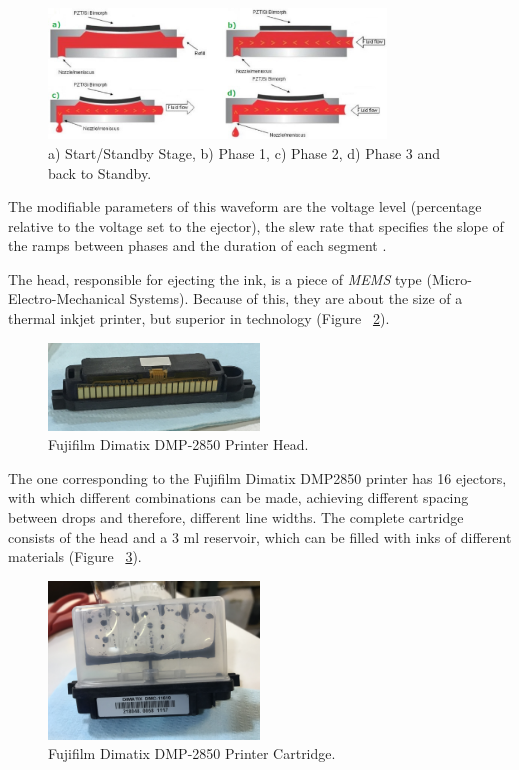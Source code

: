 \begin{figure}[H]
  \centering
    \includegraphics[width=0.8\textwidth]{Figures/Figura_etapas_eyector}
  \caption{a) Start/Standby Stage, b) Phase 1, c) Phase 2, d) Phase 3 and back to Standby.}
  \label{fig:Figura_etapas_eyector}
\end{figure}

The modifiable parameters of this waveform are the voltage level (percentage relative to the voltage set to the ejector), the slew rate that specifies the slope of the ramps between phases and the duration of each segment \cite{DimatixUM}.

The head, responsible for ejecting the ink, is a piece of \textit{MEMS} type (Micro-Electro-Mechanical Systems). Because of this, they are about the size of a thermal inkjet printer, but superior in technology (Figure ~\ref{fig:Figura_cabezal}).

\begin{figure}[H]
  \centering
    \includegraphics[width=0.5\textwidth]{Figures/Figura_cabezal}
  \caption{Fujifilm Dimatix DMP-2850 Printer Head.}
  \label{fig:Figura_cabezal}
\end{figure}

The one corresponding to the Fujifilm Dimatix DMP2850 printer has 16 ejectors, with which different combinations can be made, achieving different spacing between drops and therefore, different line widths. The complete cartridge consists of the head and a 3 ml reservoir, which can be filled with inks of different materials (Figure ~\ref{fig:Figura_cartucho_completo}).

\begin{figure}[H]
  \centering
    \includegraphics[width=0.5\textwidth]{Figures/Figura_cartucho_completo}
  \caption{Fujifilm Dimatix DMP-2850 Printer Cartridge.}
  \label{fig:Figura_cartucho_completo}
\end{figure}

